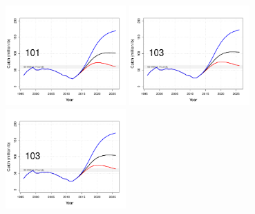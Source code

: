 \begin{figure}[htbp]
	\centering
		\includegraphics[height=1.5in]{../FIGURES/fig_SQUO_DI_YBio.pdf}
		\includegraphics[height=1.5in]{../FIGURES/fig_BSAI_DI_YBio.pdf}
		\includegraphics[height=1.5in]{../FIGURES/fig_GULF_DI_YBio.pdf}
		

\end{figure}
